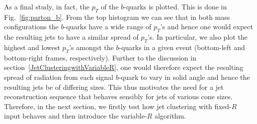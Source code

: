 \documentclass[12pt]{article}
\begin{document}
As a final study, in fact, the $p_T$ of the $b$-quarks is plotted. This is done in Fig.~\ref{fig:parton_b}.
From the top histogram we can see that in both mass configurations the $b$-quarks have a wide range of $p_T$'s and hence one would expect the resulting jets to have a similar spread of $p_T$'s. In particular, we also plot the highest and lowest $p_T$'s amongst the $b$-quarks in a given event (bottom-left and bottom-right frames, respectively). Further to the discussion in section~\ref{JetClusteringwithVariableR}, one would therefore expect the resulting spread of radiation from each signal $b$-quark to vary in  solid angle and hence the resulting jets be of differing sizes. This thus motivates the need for a jet reconstruction sequence that behaves sensibly for jets of various cone sizes. Therefore, in the next section, we firstly test how jet clustering with fixed-$R$ input behaves and then introduce the variable-$R$ algorithm.
\end{document}
